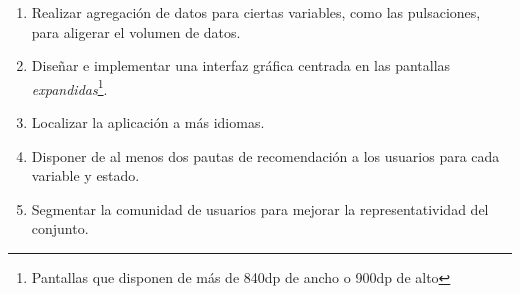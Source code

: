 \begin{enumerate}
{    Carried Forward}, \textit{Next Observation Carried Backward}... \cite{gupta_null_nodate}
    \item Realizar agregación de datos para ciertas variables, como las pulsaciones, para aligerar el volumen de datos.
    \item Diseñar e implementar una interfaz gráfica centrada en las pantallas \textit{expandidas}\footnote{Pantallas 
    que disponen de más de 840dp de ancho o 900dp de alto}.
    \item Localizar la aplicación a más idiomas.
    \item Disponer de al menos dos pautas de recomendación a los usuarios para cada variable y estado.
    \item Segmentar la comunidad de usuarios para mejorar la representatividad del conjunto.
\end{enumerate}